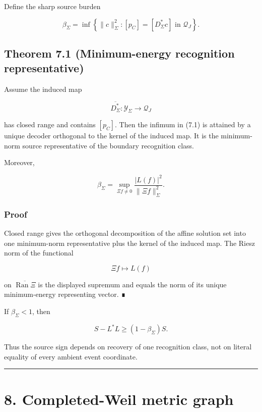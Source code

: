 Define the sharp source burden

\[
\boxed{
\beta_\Sigma
=
\inf\left\{
\|c\|_\Sigma^2:
[p_C]=[D_\Sigma^*c]
\text{ in }\mathcal Q_J
\right\}.
}
\tag{7.1}
\]

\hypertarget{theorem-7.1-minimum-energy-recognition-representative}{%
\subsection{Theorem 7.1 (Minimum-energy recognition representative)}\label{theorem-7.1-minimum-energy-recognition-representative}}

Assume the induced map

\[
\overline{D_\Sigma^*}:
\mathcal Y_\Sigma
\longrightarrow
\mathcal Q_J
\]

has closed range and contains \([p_C]\). Then the infimum in (7.1) is attained
by a unique decoder orthogonal to the kernel of the induced map. It is the
minimum-norm source representative of the boundary recognition class.

Moreover,

\[
\boxed{
\beta_\Sigma
=
\sup_{\Xi f\ne0}
\frac{|L(f)|^2}{\|\Xi f\|_\Sigma^2}.
}
\tag{7.2}
\]

\hypertarget{proof-3}{%
\subsubsection{Proof}\label{proof-3}}

Closed range gives the orthogonal decomposition of the affine solution set into
one minimum-norm representative plus the kernel of the induced map. The Riesz
norm of the functional

\[
\Xi f\mapsto L(f)
\]

on \(\overline{\operatorname{Ran}\Xi}\) is the displayed supremum and equals
the norm of its unique minimum-energy representing vector. ∎

If \(\beta_\Sigma<1\), then

\[
\boxed{
S-L^*L
\ge
(1-\beta_\Sigma)S.
}
\tag{7.3}
\]

Thus the source sign depends on recovery of one recognition class, not on
literal equality of every ambient event coordinate.

\begin{center}\rule{0.5\linewidth}{0.5pt}\end{center}

\hypertarget{completed-weil-metric-graph}{%
\section{8. Completed-Weil metric graph}\label{completed-weil-metric-graph}}

